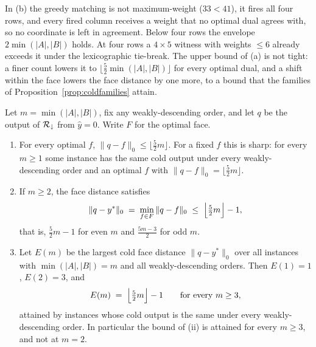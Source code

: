 In (b) the greedy matching is not maximum-weight ($33 < 41$), it fires all four rows, and every
fired column receives a weight that no optimal dual agrees with, so no coordinate is left in agreement. Below
four rows the envelope $2\min(|A|,|B|)$ holds. At four rows a $4 \times 5$ witness with weights
$\le 6$ already exceeds it under the lexicographic tie-break. The upper bound of (a) is not tight: a finer count lowers it
to $\lfloor \tfrac52 \min(|A|,|B|) \rfloor$ for every optimal dual, and a shift within the face
lowers the face distance by one more, to a bound that the families of
Proposition~\ref{prop:coldfamilies} attain.

\begin{theorem}\label{thm:coldfivehalves}
Let $m = \min(|A|,|B|)$, fix any weakly-descending order, and let $q$ be the output of
$\mathcal{R}_\downarrow$ from $\hat y = 0$. Write $F$ for the optimal face.
\begin{enumerate}
\item[(i)] For every optimal $f$, $\|q-f\|_0 \le \lfloor \tfrac52 m \rfloor$. For a fixed $f$ this
  is sharp: for every $m \ge 1$ some instance has the same cold output under every
  weakly-descending order and an optimal $f$ with $\|q-f\|_0 = \lfloor \tfrac52 m \rfloor$.
\item[(ii)] If $m \ge 2$, the face distance satisfies
  \[
    \|q-y^*\|_0 \;=\; \min_{f \in F} \|q-f\|_0 \;\le\; \Bigl\lfloor \tfrac{5}{2} m \Bigr\rfloor - 1 ,
  \]
  that is, $\tfrac52 m - 1$ for even $m$ and $\tfrac{5m-3}{2}$ for odd $m$.
\item[(iii)] Let $E(m)$ be the largest cold face distance $\|q-y^*\|_0$ over all instances with
  $\min(|A|,|B|) = m$ and all weakly-descending orders. Then $E(1) = 1$, $E(2) = 3$, and
  \[
    E(m) \;=\; \Bigl\lfloor \tfrac{5}{2} m \Bigr\rfloor - 1 \qquad \text{for every } m \ge 3,
  \]
  attained by instances whose cold output is the same under every weakly-descending order. In
  particular the bound of (ii) is attained for every $m \ge 3$, and not at $m = 2$.
\end{enumerate}
\end{theorem}

